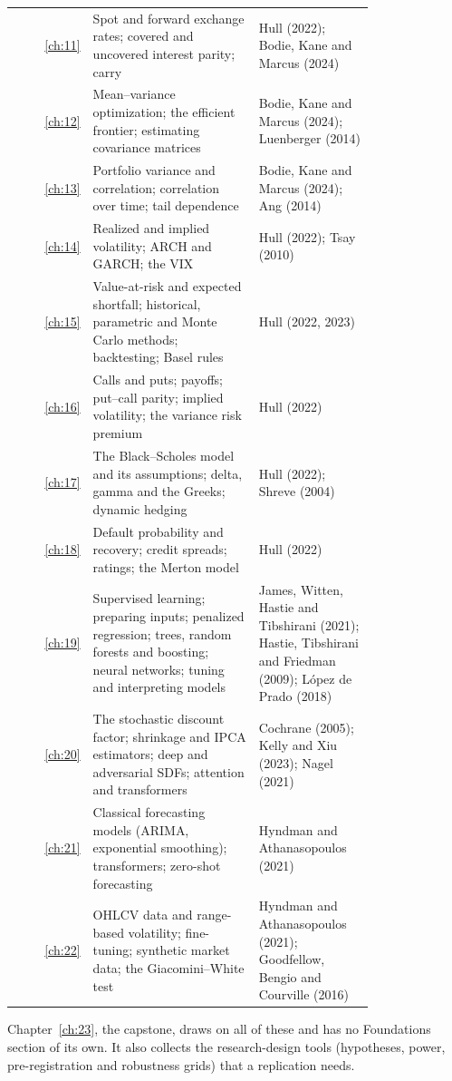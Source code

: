\begin{longtable}{@{}r>{\raggedright\arraybackslash}p{0.468\linewidth}>{\raggedright\arraybackslash}p{0.324\linewidth}@{}}
\ref{ch:11} & Spot and forward exchange rates; covered and uncovered interest parity; carry & Hull (2022); Bodie, Kane and Marcus (2024) \\
\ref{ch:12} & Mean--variance optimization; the efficient frontier; estimating covariance matrices & Bodie, Kane and Marcus (2024); Luenberger (2014) \\
\ref{ch:13} & Portfolio variance and correlation; correlation over time; tail dependence & Bodie, Kane and Marcus (2024); Ang (2014) \\
\ref{ch:14} & Realized and implied volatility; ARCH and GARCH; the VIX & Hull (2022); Tsay (2010) \\
\ref{ch:15} & Value-at-risk and expected shortfall; historical, parametric and Monte Carlo methods; backtesting; Basel rules & Hull (2022, 2023) \\
\ref{ch:16} & Calls and puts; payoffs; put--call parity; implied volatility; the variance risk premium & Hull (2022) \\
\ref{ch:17} & The Black--Scholes model and its assumptions; delta, gamma and the Greeks; dynamic hedging & Hull (2022); Shreve (2004) \\
\ref{ch:18} & Default probability and recovery; credit spreads; ratings; the Merton model & Hull (2022) \\
\ref{ch:19} & Supervised learning; preparing inputs; penalized regression; trees, random forests and boosting; neural networks; tuning and interpreting models & James, Witten, Hastie and Tibshirani (2021); Hastie, Tibshirani and Friedman (2009); L\'opez de Prado (2018) \\
\ref{ch:20} & The stochastic discount factor; shrinkage and IPCA estimators; deep and adversarial SDFs; attention and transformers & Cochrane (2005); Kelly and Xiu (2023); Nagel (2021) \\
\ref{ch:21} & Classical forecasting models (ARIMA, exponential smoothing); transformers; zero-shot forecasting & Hyndman and Athanasopoulos (2021) \\
\ref{ch:22} & OHLCV data and range-based volatility; fine-tuning; synthetic market data; the Giacomini--White test & Hyndman and Athanasopoulos (2021); Goodfellow, Bengio and Courville (2016) \\
\end{longtable}
\endgroup

Chapter~\ref{ch:23}, the capstone, draws on all of these and has no Foundations section of its own. It also collects the research-design tools (hypotheses, power, pre-registration and robustness grids) that a replication needs.


